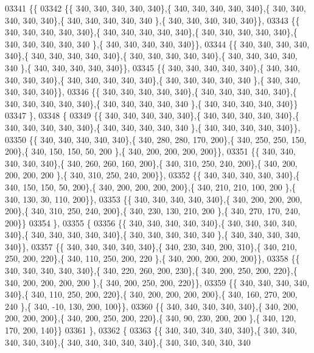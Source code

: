 \begin{DoxyCode}
03341 \{\{
03342 \{\{ 340, 340, 340, 340, 340\},\{ 340, 340, 340, 340, 340\},\{ 340, 340, 340, 340, 340\},\{ 340, 340, 340, 340, 340
      \},\{ 340, 340, 340, 340, 340\}\},
03343 \{\{ 340, 340, 340, 340, 340\},\{ 340, 340, 340, 340, 340\},\{ 340, 340, 340, 340, 340\},\{ 340, 340, 340, 340, 340
      \},\{ 340, 340, 340, 340, 340\}\},
03344 \{\{ 340, 340, 340, 340, 340\},\{ 340, 340, 340, 340, 340\},\{ 340, 340, 340, 340, 340\},\{ 340, 340, 340, 340, 340
      \},\{ 340, 340, 340, 340, 340\}\},
03345 \{\{ 340, 340, 340, 340, 340\},\{ 340, 340, 340, 340, 340\},\{ 340, 340, 340, 340, 340\},\{ 340, 340, 340, 340, 340
      \},\{ 340, 340, 340, 340, 340\}\},
03346 \{\{ 340, 340, 340, 340, 340\},\{ 340, 340, 340, 340, 340\},\{ 340, 340, 340, 340, 340\},\{ 340, 340, 340, 340, 340
      \},\{ 340, 340, 340, 340, 340\}\}
03347 \},
03348 \{
03349 \{\{ 340, 340, 340, 340, 340\},\{ 340, 340, 340, 340, 340\},\{ 340, 340, 340, 340, 340\},\{ 340, 340, 340, 340, 340
      \},\{ 340, 340, 340, 340, 340\}\},
03350 \{\{ 340, 340, 340, 340, 340\},\{ 340, 280, 280, 170, 200\},\{ 340, 250, 250, 150, 200\},\{ 340, 150, 150,  50, 200
      \},\{ 340, 200, 200, 200, 200\}\},
03351 \{\{ 340, 340, 340, 340, 340\},\{ 340, 260, 260, 160, 200\},\{ 340, 310, 250, 240, 200\},\{ 340, 200, 200, 200, 200
      \},\{ 340, 310, 250, 240, 200\}\},
03352 \{\{ 340, 340, 340, 340, 340\},\{ 340, 150, 150,  50, 200\},\{ 340, 200, 200, 200, 200\},\{ 340, 210, 210, 100, 200
      \},\{ 340, 130,  30, 110, 200\}\},
03353 \{\{ 340, 340, 340, 340, 340\},\{ 340, 200, 200, 200, 200\},\{ 340, 310, 250, 240, 200\},\{ 340, 230, 130, 210, 200
      \},\{ 340, 270, 170, 240, 200\}\}
03354 \},
03355 \{
03356 \{\{ 340, 340, 340, 340, 340\},\{ 340, 340, 340, 340, 340\},\{ 340, 340, 340, 340, 340\},\{ 340, 340, 340, 340, 340
      \},\{ 340, 340, 340, 340, 340\}\},
03357 \{\{ 340, 340, 340, 340, 340\},\{ 340, 230, 340, 200, 310\},\{ 340, 210, 250, 200, 220\},\{ 340, 110, 250, 200, 220
      \},\{ 340, 200, 200, 200, 200\}\},
03358 \{\{ 340, 340, 340, 340, 340\},\{ 340, 220, 260, 200, 230\},\{ 340, 200, 250, 200, 220\},\{ 340, 200, 200, 200, 200
      \},\{ 340, 200, 250, 200, 220\}\},
03359 \{\{ 340, 340, 340, 340, 340\},\{ 340, 110, 250, 200, 220\},\{ 340, 200, 200, 200, 200\},\{ 340, 160, 270, 200, 240
      \},\{ 340, -10, 130, 200, 100\}\},
03360 \{\{ 340, 340, 340, 340, 340\},\{ 340, 200, 200, 200, 200\},\{ 340, 200, 250, 200, 220\},\{ 340,  90, 230, 200, 200
      \},\{ 340, 120, 170, 200, 140\}\}
03361 \},
03362 \{
03363 \{\{ 340, 340, 340, 340, 340\},\{ 340, 340, 340, 340, 340\},\{ 340, 340, 340, 340, 340\},\{ 340, 340, 340, 340, 340

\end{DoxyCode}
